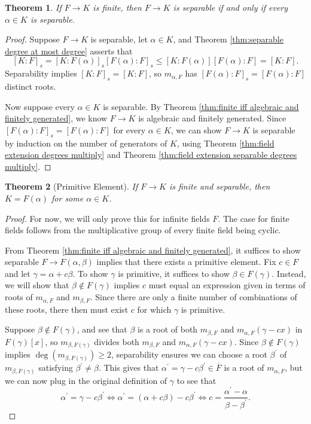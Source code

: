 \documentclass[
    parskip=half,
    toc=flat,
    toc=sectionentrydotfill,
]{scrartcl}  %
\theoremstyle{definition}
\theoremstyle{plain}
\newtheorem{theorem}{Theorem}[section]
\theoremstyle{remark}
\begin{document}
\begin{theorem}
    If $F\to K$ is finite, then $F\to K$ is separable if and only if every $\alpha\in K$ is separable.
\end{theorem}

\begin{proof}
    Suppose $F\to K$ is separable, let $\alpha\in K$, and Theorem \ref{thm:separable degree at most degree} asserts
    that \[[K:F]_s=[K:F(\alpha)]_s[F(\alpha):F]_s\leq[K:F(\alpha)][F(\alpha):F]=[K:F]\text{.}\]
    Separability implies $[K:F]_s=[K:F]$, so $m_{\alpha,F}$ has $[F(\alpha):F]_s=[F(\alpha):F]$ distinct roots.
    
    Now suppose every $\alpha\in K$ is separable.
    By Theorem \ref{thm:finite iff algebraic and finitely generated}, we know $F\to K$ is algebraic and finitely
    generated.
    Since $[F(\alpha):F]_s=[F(\alpha):F]$ for every $\alpha\in K$, we can show $F\to K$ is separable by induction on
    the number of generators of $K$, using Theorem \ref{thm:field extension degrees multiply} and Theorem
    \ref{thm:field extension separable degrees multiply}.
\end{proof}

\begin{theorem}[Primitive Element]
    \label{thm:Primitive Element}
    If $F\to K$ is finite and separable, then $K=F(\alpha)$ for some $\alpha\in K$.
\end{theorem}

\begin{proof}
    For now, we will only prove this for infinite fields $F$.
    The case for finite fields follows from the multiplicative group of every finite field being cyclic.

    From Theorem \ref{thm:finite iff algebraic and finitely generated}, it suffices to show separable
    $F\to F(\alpha,\beta)$ implies that there exists a primitive element.
    Fix $c\in F$ and let $\gamma=\alpha+c\beta$.
    To show $\gamma$ is primitive, it suffices to show $\beta\in F(\gamma)$.
    Instead, we will show that $\beta\notin F(\gamma)$ implies $c$ must equal an expression given in terms of roots of
    $m_{\alpha,F}$ and $m_{\beta,F}$.
    Since there are only a finite number of combinations of these roots, there then must exist $c$ for which $\gamma$
    is primitive.

    Suppose $\beta\notin F(\gamma)$, and see that $\beta$ is a root of both $m_{\beta,F}$ and $m_{\alpha,F}(\gamma-cx)$
    in $F(\gamma)[x]$, so $m_{\beta,F(\gamma)}$ divides both $m_{\beta,F}$ and $m_{\alpha,F}(\gamma-cx)$.
    Since $\beta\notin F(\gamma)$ implies $\deg(m_{\beta,F(\gamma)})\geq 2$, separability ensures we can choose a root
    $\beta^\prime$ of $m_{\beta,F(\gamma)}$ satisfying $\beta^\prime\neq\beta$.
    This gives that $\alpha^\prime=\gamma-c\beta^\prime\in\overline{F}$ is a root of $m_{\alpha,F}$, but we can now
    plug in the original definition of $\gamma$ to see that
    \[\alpha^\prime=\gamma-c\beta^\prime\iff\alpha^\prime=(\alpha+c\beta)-c\beta^\prime\iff c=\frac{\alpha^\prime-\alpha}{\beta-\beta^\prime}\text{.}\]
\end{proof}
\end{document}
